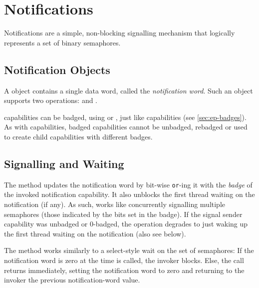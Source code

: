 %
%
%
%

\chapter{\label{ch:notifications}Notifications}

Notifications are a simple, non-blocking signalling mechanism that
logically represents a set of binary semaphores.

\section{Notification Objects}

A  object contains a single data word, called the
\emph{notification word}. Such an object supports two operations:
 and
.

 capabilities can be badged, using
 or
, just like 
capabilities (see \autoref{sec:ep-badges}). As with 
capabilities, badged  capabilities cannot be
  unbadged, rebadged or used to create child capabilities with
  different badges. \label{s:notif-badge}

\section{Signalling and Waiting}

The  method updates the
notification word by bit-wise \texttt{or}-ing it with the \emph{badge}
of the invoked notification capability. It also unblocks the first
thread waiting on the notification (if any). As such,
 works like concurrently signalling
multiple semaphores (those indicated by the bits set in the badge).
If the signal sender capability was unbadged or 0-badged, the operation degrades
to just waking up the first thread waiting on the notification (also see below).

The  method works similarly to a
select-style wait on the set of semaphores: If the notification word is
zero at the time  is called, the
invoker blocks. Else, the call returns immediately, setting the
notification word to zero and returning to the invoker the previous
notification-word value.

